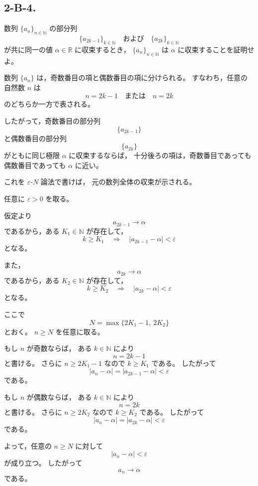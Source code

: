 \subsection{2-B-4.}
\begin{exercise}
	数列 \(\{a_n\}_{n\in\mathbb{N}}\) の部分列
	\[
	\{a_{2k-1}\}_{k\in\mathbb{N}}
	\quad\text{および}\quad
	\{a_{2k}\}_{k\in\mathbb{N}}
	\]
	が共に同一の値 \(\alpha\in\mathbb{R}\) に収束するとき，
	\(\{a_n\}_{n\in\mathbb{N}}\) は \(\alpha\) に収束することを証明せよ。
\end{exercise}

\begin{background}
	数列 \(\{a_n\}\) は，奇数番目の項と偶数番目の項に分けられる。
	すなわち，任意の自然数 \(n\) は
	\[
	n=2k-1
	\quad\text{または}\quad
	n=2k
	\]
	のどちらか一方で表される。
	
	したがって，奇数番目の部分列
	\[
	\{a_{2k-1}\}
	\]
	と偶数番目の部分列
	\[
	\{a_{2k}\}
	\]
	がともに同じ極限 \(\alpha\) に収束するならば，
	十分後ろの項は，奇数番目であっても偶数番目であっても
	\(\alpha\) に近い。
	
	これを \(\varepsilon\)-\(N\) 論法で書けば，
	元の数列全体の収束が示される。
\end{background}

\begin{strategy}
	任意に \(\varepsilon>0\) を取る。
	
	仮定より
	\[
	a_{2k-1}\to\alpha
	\]
	であるから，ある \(K_1\in\mathbb{N}\) が存在して，
	\[
	k\geq K_1
	\quad\Longrightarrow\quad
	|a_{2k-1}-\alpha|<\varepsilon
	\]
	となる。
	
	また，
	\[
	a_{2k}\to\alpha
	\]
	であるから，ある \(K_2\in\mathbb{N}\) が存在して，
	\[
	k\geq K_2
	\quad\Longrightarrow\quad
	|a_{2k}-\alpha|<\varepsilon
	\]
	となる。
	
	ここで
	\[
	N=\max\{2K_1-1,\ 2K_2\}
	\]
	とおく。
	\(n\geq N\) を任意に取る。
	
	もし \(n\) が奇数ならば，
	ある \(k\in\mathbb{N}\) により
	\[
	n=2k-1
	\]
	と書ける。
	さらに \(n\geq 2K_1-1\) なので \(k\geq K_1\) である。
	したがって
	\[
	|a_n-\alpha|
	=
	|a_{2k-1}-\alpha|
	<\varepsilon
	\]
	である。
	
	もし \(n\) が偶数ならば，
	ある \(k\in\mathbb{N}\) により
	\[
	n=2k
	\]
	と書ける。
	さらに \(n\geq 2K_2\) なので \(k\geq K_2\) である。
	したがって
	\[
	|a_n-\alpha|
	=
	|a_{2k}-\alpha|
	<\varepsilon
	\]
	である。
	
	よって，任意の \(n\geq N\) に対して
	\[
	|a_n-\alpha|<\varepsilon
	\]
	が成り立つ。
	したがって
	\[
	a_n\to\alpha
	\]
	である。
\end{strategy}